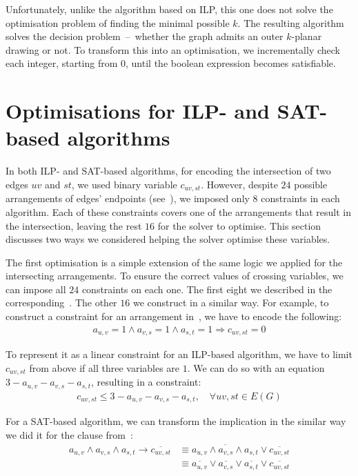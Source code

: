 Unfortunately, unlike the algorithm based on ILP, this one does not solve the optimisation problem of finding the minimal possible \(k\). The resulting algorithm solves the decision problem~--~whether the graph admits an outer \(k\)-planar drawing or not. To transform this into an optimisation, we incrementally check each integer, starting from \(0\), until the boolean expression becomes satisfiable.


\section{Optimisations for ILP- and SAT-based algorithms}\label{sec:optimisations}

In both ILP- and SAT-based algorithms, for encoding the intersection of two edges \(uv\) and \(st\), we used binary variable \(c_{uv, st}\). However, despite \(24\) possible arrangements of edges' endpoints (see~), we imposed only \(8\) constraints in each algorithm. Each of these constraints covers one of the arrangements that result in the intersection, leaving the rest \(16\) for the solver to optimise. This section discusses two ways we considered helping the solver optimise these variables.

The first optimisation is a simple extension of the same logic we applied for the intersecting arrangements. To ensure the correct values of crossing variables, we can impose all \(24\) constraints on each one. The first eight we described in the corresponding~. The other \(16\) we construct in a similar way. For example, to construct a constraint for an arrangement in~, we have to encode the following:
\begin{gather*}
    a_{u,v} = 1 \land a_{v,s} = 1 \land a_{s,t} = 1 \Longrightarrow c_{uv, st} = 0
\end{gather*}

To represent it as a linear constraint for an ILP-based algorithm, we have to limit \(c_{uv, st}\) from above if all three variables are \(1\). We can do so with an equation \(3 - a_{u,v} - a_{v,s} - a_{s,t}\), resulting in a constraint:
\begin{gather*}
    c_{uv, st} \leqslant 3 - a_{u,v} - a_{v,s} - a_{s,t},\quad\forall uv, st \in E(G)
\end{gather*}

For a SAT-based algorithm, we can transform the implication in the similar way we did it for the clause from~:
\begin{align*}
    a_{u,v} \land a_{v,s} \land a_{s,t} \rightarrow \overline{c_{uv, st}}
    & \equiv \overline{a_{u,v} \land a_{v,s} \land a_{s,t}} \lor \overline{c_{uv, st}} \\
    & \equiv \overline{a_{u,v}} \lor \overline{a_{v,s}} \lor \overline{a_{s,t}} \lor \overline{c_{uv, st}}
\end{align*}

